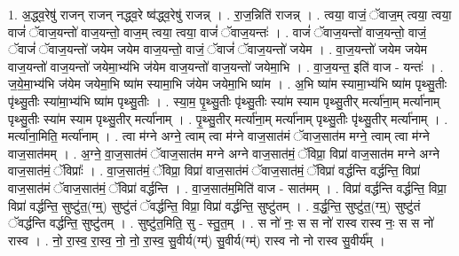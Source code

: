 \documentclass[17pt]{extarticle}
\begin{document}
1. अ॒द्ध्व॒रेषु॑ राजन् राजन् नद्ध्व॒रे ष्व॑द्ध्व॒रेषु॑ राजन्न् । . रा॒ज॒न्निति॑ राजन्न् । . त्वया॒ वाजं॒ ॅवाज॒म् त्वया॒ त्वया॒ वाजं॑ ॅवाज॒यन्तो॑ वाज॒यन्तो॒ वाज॒म् त्वया॒ त्वया॒ वाजं॑ ॅवाज॒यन्तः॑ । . वाजं॑ ॅवाज॒यन्तो॑ वाज॒यन्तो॒ वाजं॒ ॅवाजं॑ ॅवाज॒यन्तो॑ जयेम जयेम वाज॒यन्तो॒ वाजं॒ ॅवाजं॑ ॅवाज॒यन्तो॑ जयेम । . वा॒ज॒यन्तो॑ जयेम जयेम वाज॒यन्तो॑ वाज॒यन्तो॑ जयेमा॒भ्य॑भि ज॑येम वाज॒यन्तो॑ वाज॒यन्तो॑ जयेमा॒भि । . वा॒ज॒यन्त॒ इति॑ वाज - यन्तः॑ । . ज॒ये॒मा॒भ्य॑भि ज॑येम जयेमा॒भि ष्या॑म स्यामा॒भि ज॑येम जयेमा॒भि ष्या॑म । . अ॒भि ष्या॑म स्यामा॒भ्य॑भि ष्या॑म पृथ्सु॒तीः पृ॑थ्सु॒तीः स्या॑मा॒भ्य॑भि ष्या॑म पृथ्सु॒तीः । . स्या॒म॒ पृ॒थ्सु॒तीः पृ॑थ्सु॒तीः स्या॑म स्याम पृथ्सु॒तीर् मर्त्या॑ना॒म् मर्त्या॑नाम् पृथ्सु॒तीः स्या॑म स्याम पृथ्सु॒तीर् मर्त्या॑नाम् । . पृ॒थ्सु॒तीर् मर्त्या॑ना॒म् मर्त्या॑नाम् पृथ्सु॒तीः पृ॑थ्सु॒तीर् मर्त्या॑नाम् । . मर्त्या॑ना॒मिति॒ मर्त्या॑नाम् । . त्वा म॑ग्ने अग्ने॒ त्वाम् त्वा म॑ग्ने वाज॒सात॑मं ॅवाज॒सात॑म मग्ने॒ त्वाम् त्वा म॑ग्ने वाज॒सात॑मम् । . अ॒ग्ने॒ वा॒ज॒सात॑मं ॅवाज॒सात॑म मग्ने अग्ने वाज॒सात॑मं॒ ॅविप्रा॒ विप्रा॑ वाज॒सात॑म मग्ने अग्ने वाज॒सात॑मं॒ ॅविप्राः᳚ । . वा॒ज॒सात॑मं॒ ॅविप्रा॒ विप्रा॑ वाज॒सात॑मं ॅवाज॒सात॑मं॒ ॅविप्रा॑ वर्द्धन्ति वर्द्धन्ति॒ विप्रा॑ वाज॒सात॑मं ॅवाज॒सात॑मं॒ ॅविप्रा॑ वर्द्धन्ति । . वा॒ज॒सात॑म॒मिति॑ वाज - सात॑मम् । . विप्रा॑ वर्द्धन्ति वर्द्धन्ति॒ विप्रा॒ विप्रा॑ वर्द्धन्ति॒ सुष्टु॑त॒(ग्म्॒) सुष्टु॑तं ॅवर्द्धन्ति॒ विप्रा॒ विप्रा॑ वर्द्धन्ति॒ सुष्टु॑तम् । . व॒र्द्ध॒न्ति॒ सुष्टु॑त॒(ग्म्॒) सुष्टु॑तं ॅवर्द्धन्ति वर्द्धन्ति॒ सुष्टु॑तम् । . सुष्टु॑त॒मिति॒ सु - स्तु॒त॒म् । . स नो॑ नः॒ स स नो॑ रास्व रास्व नः॒ स स नो॑ रास्व । . नो॒ रा॒स्व॒ रा॒स्व॒ नो॒ नो॒ रा॒स्व॒ सु॒वीर्य(ग्म्॑) सु॒वीर्य(ग्म्॑) रास्व नो नो रास्व सु॒वीर्य᳚म् । \newline
\end{document}
